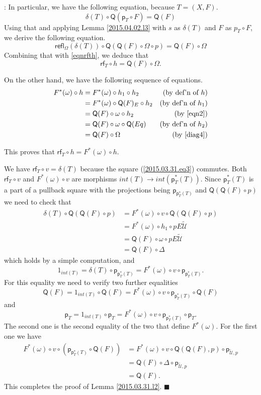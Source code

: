 \documentclass[12pt]{article}
\numberwithin{equation}{section}
\newenvironment{myproof}{{\bf Proof}:}{$\blacksquare$ \vskip 5mm }
\newcommand{\by}[1]{\text{(by #1)}}
\newcommand{\sr}{\rightarrow}
\newcommand{\wt}{\widetilde}
\newcommand{\id}{1}            %
\newcommand{\p}{\mathsf{p}}
\newcommand{\refl}{\mathsf{refl}}
\newcommand{\U}{\mathcal{U}}
\newcommand{\rf}{\mathsf{rf}}
\newcommand{\Q}{\mathsf{Q}}
\begin{document}
\begin{myproof}
In particular, we have the following equation, because $T = (X,F)$.
\[
  \delta(T) \circ \Q(\p_T \circ F) = \Q(F)
\]
Using that and applying Lemma \ref{2015.04.02.l3} with $s$ as $\delta(T)$ and $F$ as $p_T \circ F$,
we derive the following equation.
%
\[
  \refl_\Omega(\delta(T))\circ \Q(\Q(F)\circ \Omega\circ p)=\Q(F)\circ \Omega
\]
Combining that with \ref{eqnrfth}, we deduce that 
\[
  \rf_T \circ h = \Q(F)\circ \Omega.
\]

On the other hand, we have the following sequence of equations.
\begin{align*}
  F^*(\omega) \circ h & = F^*(\omega) \circ h_1 \circ h_2    & \by{def'n of $h$} \\
                      & = F^*(\omega) \circ \Q(F)_E \circ h_2 & \by{def'n of $h_1$} \\
                      & = \Q(F) \circ \omega \circ h_2       & \by{\ref{eqn2}} \\
                      & = \Q(F) \circ \omega \circ \Q(Eq)    & \by{def'n of $h_2$} \\
                      & = \Q(F) \circ \Omega                 & \by{\ref{diag4}}
\end{align*}

This proves that $\rf_T\circ h=F^*(\omega)\circ h$.

We have $\rf_T\circ v=\delta(T)$ because the square (\ref{2015.03.31.eq3})
commutes.  Both $\rf_T\circ v$ and $F^*(\omega)\circ v$ are morphisms $int(T)\sr
int(\p_T^*(T))$. Since $\p_T^*(T)$ is a part of a pullback square with the
projections being $\p_{\p_T^*(T)}$ and $\Q(\Q(F)\circ p)$ we need to check that
%
\begin{align*}
  \delta(T)\circ \Q(\Q(F)\circ p)
    & = F^*(\omega)\circ v\circ \Q(\Q(F)\circ p) \\
    & = F^*(\omega)\circ h_1\circ pE\wt{\U} \\
    & = \Q(F)\circ \omega \circ pE\wt{\U} \\
    & = \Q(F)\circ \Delta
\end{align*}
%
which holds by a simple computation, and
%
\[\id_{int(T)}=\delta(T)\circ \p_{\p_T^*(T)}=F^*(\omega)\circ v\circ
\p_{\p_T^*(T)}.\]
%
For this equality we need to verify two further equalities
%
$$\Q(F)=\id_{int(T)}\circ \Q(F)=F^*(\omega)\circ v\circ \p_{\p_T^*(T)}\circ \Q(F)$$
%
and
%
\[\p_T=\id_{int(T)}\circ \p_T=F^*(\omega)\circ v\circ \p_{\p_T^*(T)}\circ \p_T.\]
%
The second one is the second equality of the two that define $F^*(\omega)$. For
the first one we have
%
\begin{align*}
  F^*(\omega)\circ v\circ (\p_{\p_T^*(T)}\circ \Q(F))
    & = F^*(\omega)\circ v\circ \Q(\Q(F),p)\circ \p_{\wt{\U},p} \\
    & = \Q(F)\circ \Delta\circ \p_{\wt{\U},p} \\
    & = \Q(F).
\end{align*}
%
This completes the proof of Lemma \ref{2015.03.31.l2}.
\end{myproof}
%
 
\end{document}

